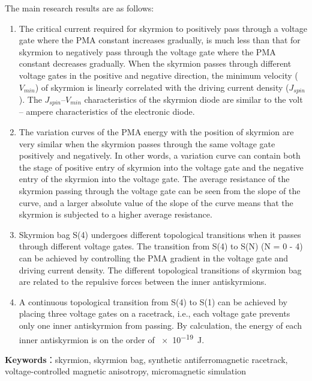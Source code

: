 The main research results are as follows:
\begin{enumerate}[label=(\arabic*), leftmargin=4ex, labelsep=1.4ex, itemsep=0pt, topsep=1ex,partopsep=1ex,parsep=0pt]
    \item The critical current required for skyrmion to positively pass through a voltage gate where the PMA constant increases gradually, is much less than that for skyrmion to negatively pass through the voltage gate where the PMA constant decreases gradually. 
    When the skyrmion passes through different voltage gates in the positive and negative direction, the minimum velocity ($V_{min}$) of skyrmion is linearly correlated with the driving current density ($J_{spin}$). 
    The $J_{spin}$--$V_{min}$ characteristics of the skyrmion diode are similar to the volt -- ampere characteristics of the electronic diode.
    \item The variation curves of the PMA energy with the position of skyrmion are very similar when the skyrmion passes through the same voltage gate positively and negatively. 
    In other words, a variation curve can contain both the stage of positive entry of skyrmion into the voltage gate and the negative entry of the skyrmion into the voltage gate. 
    The average resistance of the skyrmion passing through the voltage gate can be seen from the slope of the curve, and a larger absolute value of the slope of the curve means that the skyrmion is subjected to a higher average resistance.
    \item Skyrmion bag S(4) undergoes different topological transitions when it passes through different voltage gates. 
    The transition from S(4) to S(N) (N = 0 - 4) can be achieved by controlling the PMA gradient in the voltage gate and driving current density. 
    The different topological transitions of skyrmion bag are related to the repulsive forces between the inner antiskyrmions.
    \item A continuous topological transition from S(4) to S(1) can be achieved by placing three voltage gates on a racetrack, i.e., each voltage gate prevents only one inner antiskyrmion from passing. 
    By calculation, the energy of each inner antiskyrmion is on the order of \SI{e-19}{J}.
\end{enumerate}
\vspace{1em}
\textbf{Keywords}：skyrmion, skyrmion bag, synthetic antiferromagnetic racetrack, voltage-controlled magnetic anisotropy, micromagnetic simulation
\newpage